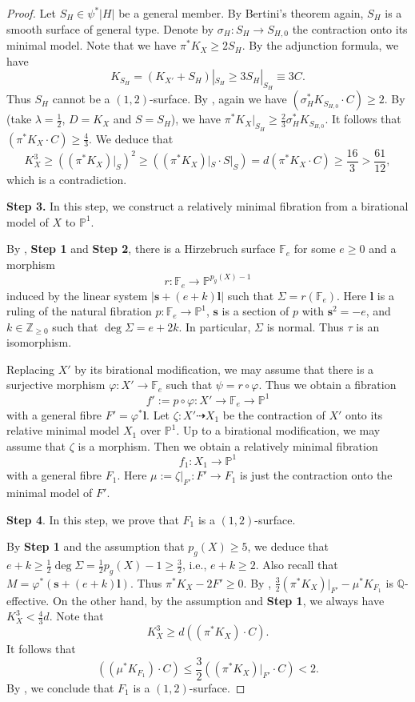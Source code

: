 \documentclass[a4paper,11pt]{amsart}
\newcommand{\FF}{\ensuremath{\mathbb{F}}}
\newcommand{\PP}{\ensuremath{\mathbb{P}}}
\newcommand{\QQ}{\ensuremath{\mathbb{Q}}}
\newcommand{\ZZ}{\ensuremath{\mathbb{Z}}}
\theoremstyle{definition}
\theoremstyle{remark}
\numberwithin{equation}{section}
\begin{document}
\begin{proof}
    Let $S_H \in \psi^*|H|$ be a general member. By Bertini's theorem again, $S_H$ is a smooth surface of general type. Denote by $\sigma_H: S_H \to S_{H,0}$ the contraction onto its minimal model. Note that we have $\pi^*K_X \geq 2S_H$. By the adjunction formula, we have
    $$
    K_{S_H} = (K_{X'}+S_H)|_{S_H} \geq 3 S_H|_{S_H} \equiv 3C.
    $$
    Thus $S_H$ cannot be a $(1, 2)$-surface. By \cite[Lemma 2.4]{CC}, again we have $(\sigma_H^* K_{S_{H,0}} \cdot C) \geq 2$. By \cite[Corollary 2.3]{CCJ} (take $\lambda=\frac{1}{2}$, $D=K_X$ and $S=S_H$), we have $\pi^*K_X|_{S_H}\geq \frac{2}{3}\sigma_H^*K_{S_{H,0}}$. It follows that $(\pi^*K_X\cdot C)\geq \frac{4}{3}$. We deduce that
    $$
    K_X^3 \geq \left((\pi^*K_X)|_S \right)^2 \geq ((\pi^*K_X)|_S \cdot S|_S) = d(\pi^*K_X \cdot C) \geq \frac{16}{3}>\frac{61}{12},
    $$
    which is a contradiction.

    \textbf{Step 3.} In this step, we construct a relatively minimal fibration from a birational model of $X$ to $\PP^1$.

    By \cite[\S 10]{Nagata}, \textbf{Step 1} and \textbf{Step 2}, there is a Hirzebruch surface $\mathbb{F}_e$ for some $e \ge 0$ and a morphism
    $$
	r: \mathbb{F}_e \to  \PP^{p_g(X) - 1}
	$$
    induced by the linear system $|\mathbf{s} + (e + k)\mathbf{l}|$ such that $\Sigma = r(\FF_e)$. Here $\mathbf{l}$ is a ruling of the natural fibration $p: \FF_e \to \PP^1$, $\mathbf{s}$ is a section of $p$ with $\mathbf{s}^2 = -e$, and $k \in \ZZ_{\ge 0}$ such that $\deg \Sigma = e + 2k$. In particular, $\Sigma$ is normal. Thus $\tau$ is an isomorphism.

    Replacing $X'$ by its birational modification, we may assume that there is a surjective morphism $\varphi: X' \to \FF_e$ such that $\psi = r \circ \varphi$. Thus we obtain a fibration
	$$
	f':= p \circ \varphi: X' \to \FF_e \to \PP^1
	$$
	with a general fibre $F' = \varphi^*\mathbf{l}$. Let $\zeta: X' \dashrightarrow X_1$ be the contraction of $X'$ onto its relative minimal model $X_1$ over $\PP^1$. Up to a birational modification, we may assume that $\zeta$ is a morphism. Then we obtain a relatively minimal fibration
	$$
	f_1: X_1 \to \PP^1
	$$
	with a general fibre $F_1$. Here $\mu:= \zeta|_{F'}: F' \to F_1$ is just the contraction onto the minimal model of $F'$.

    \textbf{Step 4}. In this step, we prove that $F_1$ is a $(1, 2)$-surface.
	
	By \textbf{Step 1} and the assumption that $p_g(X) \ge 5$, we deduce that $e+k \ge \frac{1}{2} \deg \Sigma = \frac{1}{2} p_g(X) - 1 \ge \frac{3}{2}$, i.e., $e + k \ge 2$. Also recall that $M = \varphi^*(\mathbf{s} + (e + k) \mathbf{l})$. Thus $\pi^*K_X - 2F' \ge 0$. By \cite[Corollary 2.3]{CCJ}, $\frac{3}{2}(\pi^*K_X)|_{F'} - \mu^*K_{F_1}$ is $\QQ$-effective.  On the other hand, by the assumption and \textbf{Step 1}, we always have $K_X^3 < \frac{4}{3}d$. Note that
	$$
    K_X^3 \ge d \left((\pi^*K_X) \cdot C \right).
	$$
	It follows  that
	$$
	\left((\mu^*K_{F_1}) \cdot C \right) \le \frac{3}{2} \left((\pi^*K_X)|_{F'} \cdot C \right) <  2.
	$$
	By \cite[Lemma 2.4]{CC}, we conclude that $F_1$ is a $(1,2)$-surface.
	

\end{proof}
\end{document}
